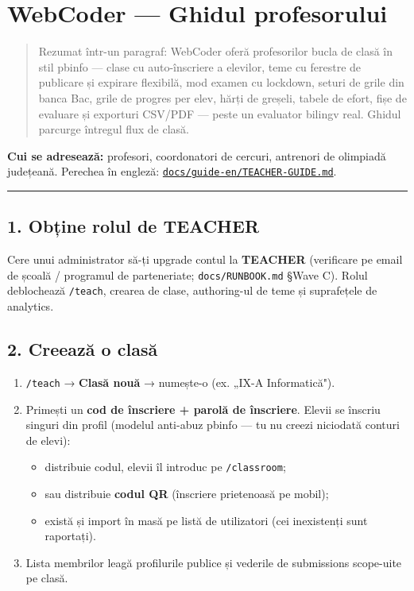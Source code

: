 \documentclass[
]{article}
\author{}
\date{}
\providecommand{\tightlist}{%
  \setlength{\itemsep}{0pt}\setlength{\parskip}{0pt}}
\begin{document}
{
\setcounter{tocdepth}{2}
\tableofcontents
}
\section{WebCoder --- Ghidul
profesorului}\label{webcoder--ghidul-profesorului}

\begin{quote}
Rezumat într-un paragraf: WebCoder oferă profesorilor bucla de clasă în
stil pbinfo --- clase cu auto-înscriere a elevilor, teme cu ferestre de
publicare și expirare flexibilă, mod examen cu lockdown, seturi de grile
din banca Bac, grile de progres per elev, hărți de greșeli, tabele de
efort, fișe de evaluare și exporturi CSV/PDF --- peste un evaluator
bilingv real. Ghidul parcurge întregul flux de clasă.
\end{quote}

\textbf{Cui se adresează:} profesori, coordonatori de cercuri, antrenori
de olimpiadă județeană. Perechea în engleză:
\href{../guide-en/TEACHER-GUIDE.md}{\texttt{docs/guide-en/TEACHER-GUIDE.md}}.

\begin{center}\rule{0.5\linewidth}{0.5pt}\end{center}

\subsection{1. Obține rolul de
TEACHER}\label{1-obux21bine-rolul-de-teacher}

Cere unui administrator să-ți upgrade contul la \textbf{TEACHER}
(verificare pe email de școală / programul de parteneriate;
\texttt{docs/RUNBOOK.md} §Wave C). Rolul deblochează \texttt{/teach},
crearea de clase, authoring-ul de teme și suprafețele de analytics.

\subsection{2. Creează o clasă}\label{2-creeazux103-o-clasux103}

\begin{enumerate}
\def\labelenumi{\arabic{enumi}.}
\tightlist
\item
  \texttt{/teach} → \textbf{Clasă nouă} → numește-o (ex. „IX-A
  Informatică").
\item
  Primești un \textbf{cod de înscriere + parolă de înscriere}. Elevii se
  înscriu singuri din profil (modelul anti-abuz pbinfo --- tu nu creezi
  niciodată conturi de elevi):

  \begin{itemize}
  \tightlist
  \item
    distribuie codul, elevii îl introduc pe \texttt{/classroom};
  \item
    sau distribuie \textbf{codul QR} (înscriere prietenoasă pe mobil);
  \item
    există și import în masă pe listă de utilizatori (cei inexistenți
    sunt raportați).
  \end{itemize}
\item
  Lista membrilor leagă profilurile publice și vederile de submissions
  scope-uite pe clasă.
\end{enumerate}
\end{document}
